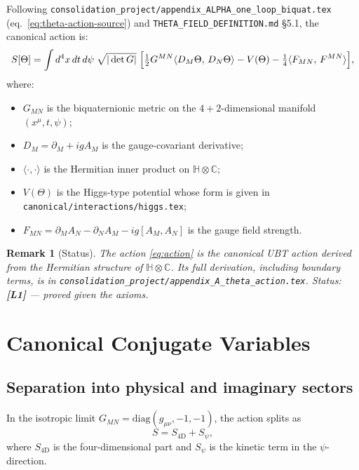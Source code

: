 \documentclass[11pt,a4paper]{article}
\newtheorem{remark}{Remark}
\begin{document}
Following \texttt{consolidation\_project/appendix\_ALPHA\_one\_loop\_biquat.tex}
(eq.\ \eqref{eq:theta-action-source}) and
\texttt{THETA\_FIELD\_DEFINITION.md} §5.1, the canonical action is:
\begin{equation}
\label{eq:action}
S[\Theta]
= \int d^4x\, dt\, d\psi\; \sqrt{|\det G|}\;
  \Bigl[
    \tfrac{1}{2} G^{MN} \langle D_M \Theta,\, D_N \Theta\rangle
    - V(\Theta)
    - \tfrac{1}{4}\langle F_{MN},\, F^{MN}\rangle
  \Bigr],
\end{equation}
where:
\begin{itemize}
  \item $G_{MN}$ is the biquaternionic metric on the $4+2$-dimensional
        manifold $(x^\mu, t, \psi)$;
  \item $D_M = \partial_M + igA_M$ is the gauge-covariant derivative;
  \item $\langle \cdot, \cdot \rangle$ is the Hermitian inner product on
        $\mathbb{H}\otimes\mathbb{C}$;
  \item $V(\Theta)$ is the Higgs-type potential whose form is given in
        \texttt{canonical/interactions/higgs.tex};
  \item $F_{MN} = \partial_M A_N - \partial_N A_M - ig[A_M, A_N]$ is the
        gauge field strength.
\end{itemize}

\begin{remark}[Status]
  The action \eqref{eq:action} is the canonical UBT action derived from the
  Hermitian structure of $\mathbb{H}\otimes\mathbb{C}$.  Its full derivation,
  including boundary terms, is in
  \texttt{consolidation\_project/appendix\_A\_theta\_action.tex}.
  Status: \textbf{[L1]} — proved given the axioms.
\end{remark}

\section{Canonical Conjugate Variables}
\label{sec:canonical}

\subsection{Separation into physical and imaginary sectors}

In the isotropic limit $G_{MN} = \mathrm{diag}(g_{\mu\nu},-1,-1)$, the
action splits as
\begin{equation}
  S = S_{\mathrm{4D}} + S_\psi,
\end{equation}
where $S_{\mathrm{4D}}$ is the four-dimensional part and $S_\psi$ is the
kinetic term in the $\psi$-direction.
\end{document}
